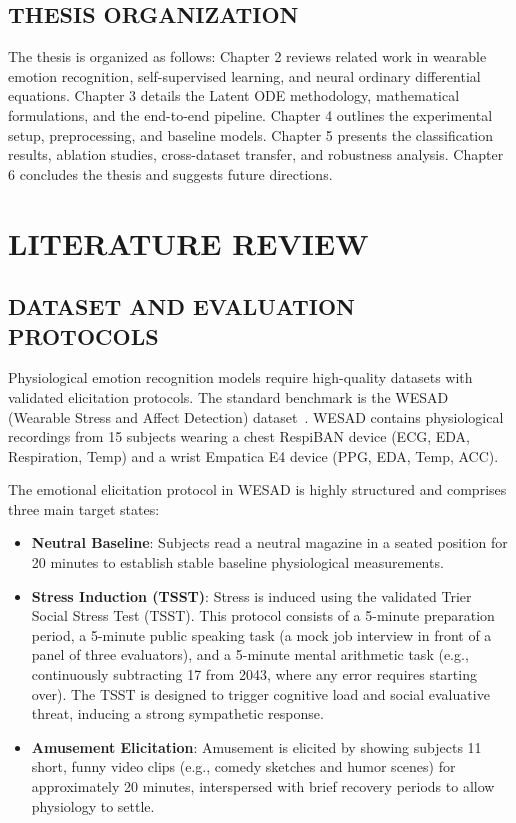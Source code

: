 \documentclass[12pt, a4paper]{report}
\numberwithin{equation}{chapter}
\begin{document}
\section{THESIS ORGANIZATION}
The thesis is organized as follows: Chapter 2 reviews related work in wearable emotion recognition, self-supervised learning, and neural ordinary differential equations. Chapter 3 details the Latent ODE methodology, mathematical formulations, and the end-to-end pipeline. Chapter 4 outlines the experimental setup, preprocessing, and baseline models. Chapter 5 presents the classification results, ablation studies, cross-dataset transfer, and robustness analysis. Chapter 6 concludes the thesis and suggests future directions.

\chapter{LITERATURE REVIEW}

\section{DATASET AND EVALUATION PROTOCOLS}
Physiological emotion recognition models require high-quality datasets with validated elicitation protocols. The standard benchmark is the WESAD (Wearable Stress and Affect Detection) dataset~\cite{schmidt2018wesad}. WESAD contains physiological recordings from 15 subjects wearing a chest RespiBAN device (ECG, EDA, Respiration, Temp) and a wrist Empatica E4 device (PPG, EDA, Temp, ACC). 

The emotional elicitation protocol in WESAD is highly structured and comprises three main target states:
\begin{itemize}
    \setlength{\itemsep}{2pt}
    \setlength{\parskip}{0pt}
    \setlength{\parsep}{0pt}
    \item \textbf{Neutral Baseline}: Subjects read a neutral magazine in a seated position for 20 minutes to establish stable baseline physiological measurements.
    \item \textbf{Stress Induction (TSST)}: Stress is induced using the validated Trier Social Stress Test (TSST). This protocol consists of a 5-minute preparation period, a 5-minute public speaking task (a mock job interview in front of a panel of three evaluators), and a 5-minute mental arithmetic task (e.g., continuously subtracting 17 from 2043, where any error requires starting over). The TSST is designed to trigger cognitive load and social evaluative threat, inducing a strong sympathetic response.
    \item \textbf{Amusement Elicitation}: Amusement is elicited by showing subjects 11 short, funny video clips (e.g., comedy sketches and humor scenes) for approximately 20 minutes, interspersed with brief recovery periods to allow physiology to settle.
\end{itemize}
\end{document}
